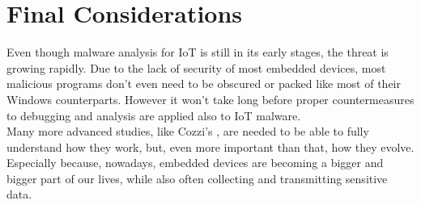 \section{Final Considerations}
Even though malware analysis for IoT is still in its early stages, the threat is growing rapidly. Due to the lack of security of most embedded devices, most malicious programs don't even need to be obscured or packed like most of their Windows counterparts. However it won't take long before proper countermeasures to debugging and analysis are applied also to IoT malware. \\
Many more advanced studies, like Cozzi's \cite{cozzi2020binary}, are needed to be able to fully understand how they work, but, even more important than that, how they evolve. Especially because, nowadays, embedded devices are becoming a bigger and bigger part of our lives, while also often collecting and transmitting sensitive data.